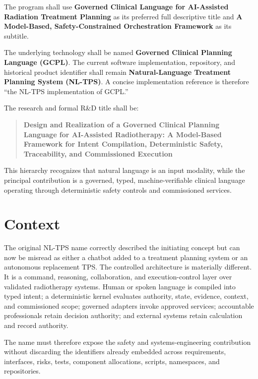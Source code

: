 \documentclass[11pt,letterpaper]{article}
\begin{document}

The program shall use \textbf{Governed Clinical Language for AI-Assisted Radiation Treatment Planning} as its preferred full descriptive title and \textbf{A Model-Based, Safety-Constrained Orchestration Framework} as its subtitle.

The underlying technology shall be named \textbf{Governed Clinical Planning Language (GCPL)}. The current software implementation, repository, and historical product identifier shall remain \textbf{Natural-Language Treatment Planning System (NL-TPS)}. A concise implementation reference is therefore ``the NL-TPS implementation of GCPL.''

The research and formal R\&D title shall be:

\begin{quote}
\textbf{Design and Realization of a Governed Clinical Planning Language for AI-Assisted Radiotherapy: A Model-Based Framework for Intent Compilation, Deterministic Safety, Traceability, and Commissioned Execution}
\end{quote}

This hierarchy recognizes that natural language is an input modality, while the principal contribution is a governed, typed, machine-verifiable clinical language operating through deterministic safety controls and commissioned services.

\section{Context}

The original NL-TPS name correctly described the initiating concept but can now be misread as either a chatbot added to a treatment planning system or an autonomous replacement TPS. The controlled architecture is materially different. It is a command, reasoning, collaboration, and execution-control layer over validated radiotherapy systems. Human or spoken language is compiled into typed intent; a deterministic kernel evaluates authority, state, evidence, context, and commissioned scope; governed adapters invoke approved services; accountable professionals retain decision authority; and external systems retain calculation and record authority.

The name must therefore expose the safety and systems-engineering contribution without discarding the identifiers already embedded across requirements, interfaces, risks, tests, component allocations, scripts, namespaces, and repositories.
\end{document}
